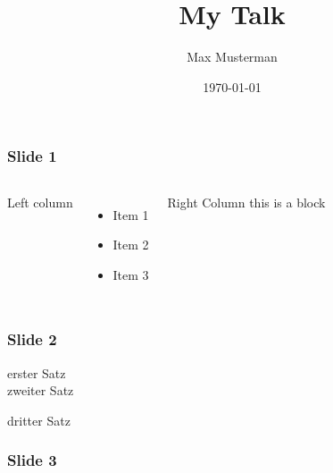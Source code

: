 \documentclass[fleqn]{beamer}
\title{My Talk}
\author{Max Musterman}
\institute[University of Vienna]{Faculty of Physics, University of Vienna}
\date{\today}
\begin{document}
\begin{frame}
  \titlepage
\end{frame}
\begin{frame}
  \frametitle{Slide 1}
  \begin{columns}[T]
    Left column
    \begin{itemize}
      \item Item 1
      \item Item 2
      \item Item 3
    \end{itemize}
    \begin{block}{Right Column}
      this is a block
    \end{block}
  \end{columns}
\end{frame}
\begin{frame}
  \frametitle{Slide 2}
  erster Satz\\
  zweiter Satz

  \pause

  dritter Satz
\end{frame}
\begin{frame}
  \frametitle{Slide 3}
  \\
  \\
\end{frame}
\end{document}
